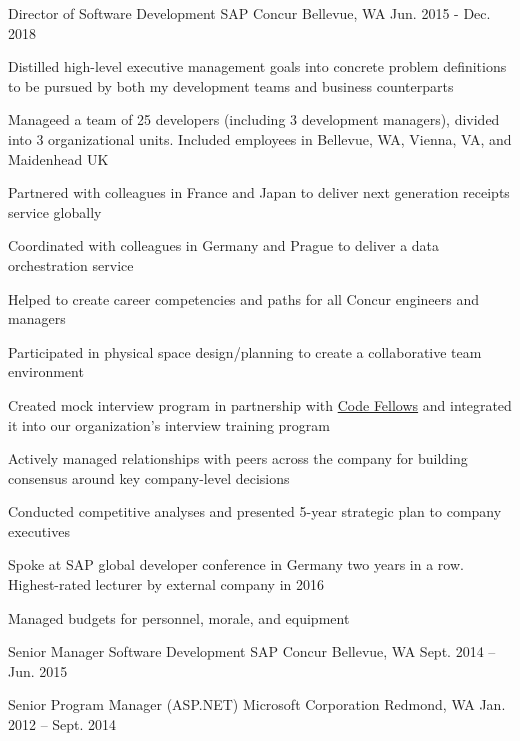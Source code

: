 \begin{cventries}

\cventry
{Director of Software Development}
{SAP Concur}
{Bellevue, WA}
{Jun. 2015 - Dec. 2018}
{
  \begin{cvitems}
  \item {Distilled high-level executive management goals into concrete problem definitions to be pursued by both my development teams and business counterparts}
  \item {Manageed a team of 25 developers (including 3 development managers), divided into 3 organizational units. Included employees in Bellevue, WA, Vienna, VA, and Maidenhead UK}
  \item {Partnered with colleagues in France and Japan to deliver next generation receipts service globally}
  \item {Coordinated with colleagues in Germany and Prague to deliver a data orchestration service}
  \item {Helped to create career competencies and paths for all Concur engineers and managers}
  \item {Participated in physical space design/planning to create a collaborative team environment}
  \item {Created mock interview program in partnership with \href{https://www.codefellows.org/}{Code Fellows} and integrated it into our organization’s interview training program}
  \item {Actively managed relationships with peers across the company for building consensus around key company-level decisions}
  \item {Conducted competitive analyses and presented 5-year strategic plan to company executives}
  \item {Spoke at SAP global developer conference in Germany two years in a row. Highest-rated lecturer by external company in 2016}
  \item {Managed budgets for personnel, morale, and equipment}
  \end{cvitems}
}


\cventry
{Senior Manager Software Development}
{SAP Concur}
{Bellevue, WA}
{Sept. 2014 – Jun. 2015}
{}


\cventry 
{Senior Program Manager (ASP.NET)}
{Microsoft Corporation}
{Redmond, WA}
{Jan. 2012 – Sept. 2014}
{}


\end{cventries}
